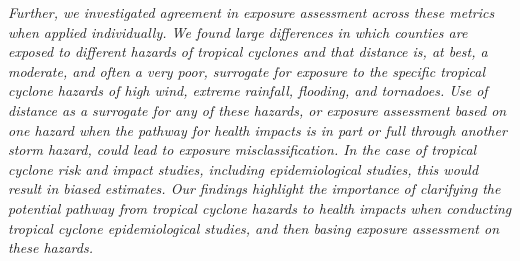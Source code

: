 \textit{Further, we investigated agreement in exposure assessment across these metrics
when applied individually. We found large differences in which counties are
exposed to different hazards of tropical cyclones and that distance is, at
best, a moderate, and often a very poor, surrogate for exposure to the specific
tropical cyclone hazards of high wind, extreme rainfall, flooding, and
tornadoes. Use of distance as a surrogate for any of these hazards, or exposure
assessment based on one hazard when the pathway for health impacts is in part
or full through another storm hazard, could lead to exposure misclassification.
In the case of tropical cyclone risk and impact studies, including
epidemiological studies, this would result in biased estimates.  Our findings
highlight the importance of clarifying the potential pathway from tropical
cyclone hazards to health impacts when conducting tropical cyclone
epidemiological studies, and then basing exposure assessment on these hazards.}

